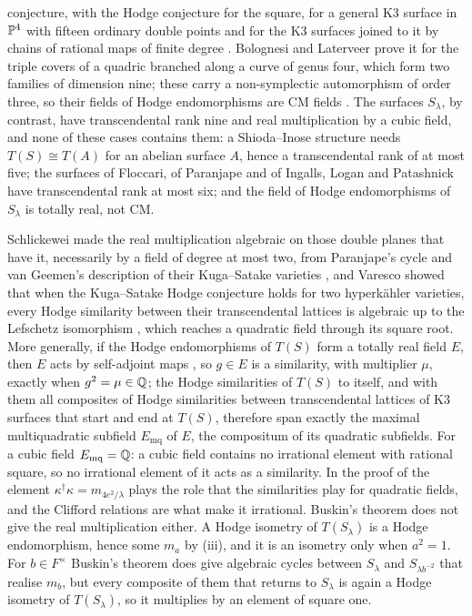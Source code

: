 \begin{remark}
conjecture, with the Hodge conjecture for the square, for a general K3
surface in $\mathbb{P}^{4}$ with fifteen ordinary double points and for the K3
surfaces joined to it by chains of rational maps of finite degree
\cite[Theorems~1.5, 4.8 and~6.4]{ILP22}. Bolognesi and Laterveer prove it for
the triple covers of a quadric branched along a curve of genus four, which
form two families of dimension nine; these carry a non-symplectic
automorphism of order three, so their fields of Hodge endomorphisms are CM
fields \cite{BL24}. The surfaces $S_{\lambda}$, by contrast, have
transcendental rank nine and real multiplication by a cubic field, and none
of these cases contains them: a Shioda--Inose structure needs
$T(S)\cong T(A)$ for an abelian surface $A$, hence a transcendental rank of at
most five; the surfaces of Floccari, of Paranjape and of Ingalls, Logan and
Patashnick have transcendental rank at most six; and the field of Hodge
endomorphisms of $S_{\lambda}$ is totally real, not CM.

Schlickewei made the real multiplication algebraic on those double planes
that have it, necessarily by a field of degree at most two, from Paranjape's
cycle and van Geemen's description of their Kuga--Satake varieties
\cite{Sch10,vG08}, and Varesco showed that when the Kuga--Satake Hodge
conjecture holds for two hyperk\"ahler varieties, every Hodge similarity
between their transcendental lattices is algebraic up to the Lefschetz
isomorphism \cite{Var23}, which reaches a quadratic field through its square
root. More generally, if the Hodge endomorphisms of $T(S)$ form a totally
real field $E$, then $E$ acts by self-adjoint maps \cite{Zar83}, so $g\in E$
is a similarity, with multiplier $\mu$, exactly when $g^{2}=\mu\in\mathbb{Q}$; the
Hodge similarities of $T(S)$ to itself, and with them all composites of Hodge
similarities between transcendental lattices of K3 surfaces that start and
end at $T(S)$, therefore span exactly the maximal multiquadratic subfield
$E_{\mathrm{mq}}$ of $E$, the compositum of its quadratic subfields. For a
cubic field $E_{\mathrm{mq}}=\mathbb{Q}$: a cubic field contains no irrational
element with rational square, so no irrational element of it acts as a
similarity. In the proof of  the element
$\kappa^{\dagger}\kappa=m_{4e^{2}/\lambda}$ plays the role that the
similarities play for quadratic fields, and the Clifford relations are what
make it irrational. Buskin's theorem \cite{Bus19} does not give the real
multiplication either. A Hodge isometry of $T(S_{\lambda})$ is a Hodge
endomorphism, hence some $m_{a}$ by (iii), and it is an
isometry only when $a^{2}=1$. For $b\in F^{\times}$ Buskin's theorem does give
algebraic cycles between $S_{\lambda}$ and $S_{\lambda b^{-2}}$ that realise
$m_{b}$, but every composite of them that returns to $S_{\lambda}$ is again a
Hodge isometry of $T(S_{\lambda})$, so it multiplies by an element of square
one.


\end{remark}
